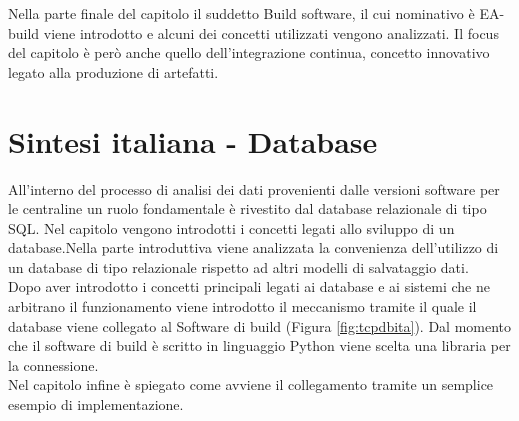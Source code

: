 \documentclass[../main.tex]{subfiles}
\begin{document}
Nella parte finale del capitolo il suddetto Build software, il cui nominativo è EA-build viene introdotto  e alcuni dei concetti utilizzati vengono analizzati. Il focus del capitolo è però anche quello dell'integrazione continua, concetto innovativo legato alla produzione di artefatti. 
\section{Sintesi italiana - Database}
All'interno del processo di analisi dei dati provenienti dalle versioni software per le centraline un ruolo fondamentale è rivestito dal database relazionale di tipo \gls{SQL}. Nel capitolo vengono introdotti i concetti legati allo sviluppo di un database.Nella parte introduttiva viene analizzata la convenienza dell'utilizzo di un database di tipo relazionale rispetto ad altri modelli di salvataggio dati. \\
Dopo aver introdotto i concetti principali legati ai database e ai sistemi che ne arbitrano il funzionamento viene introdotto il meccanismo tramite il quale il database viene collegato al Software di build (Figura \ref{fig:tcpdbita}). Dal momento che il software di build è scritto in linguaggio Python viene scelta una libraria per la connessione.\\
Nel capitolo infine è spiegato come avviene il collegamento tramite un semplice esempio di implementazione. 
\end{document}

